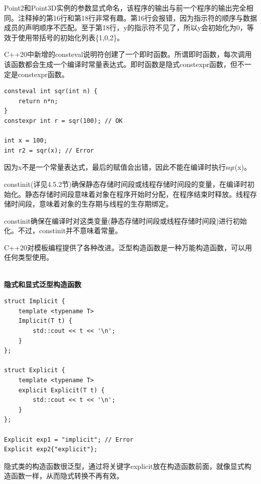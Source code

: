 Point2和Point3D实例的参数显式命名，该程序的输出与前一个程序的输出完全相同。注释掉的第16行和第18行非常有趣。第16行会报错，因为指示符的顺序与数据成员的声明顺序不匹配。至于第18行，y的指示符不见了，所以y会初始化为0，等效于使用带括号的初始化列表\{1,0,2\}。


C++20中新增的consteval说明符创建了一个即时函数。所谓即时函数，每次调用该函数都会生成一个编译时常量表达式。即时函数是隐式constexpr函数，但不一定是constexpr函数。

\begin{lstlisting}[style=styleCXX]
consteval int sqr(int n) {
	return n*n;
}
constexpr int r = sqr(100); // OK

int x = 100;
int r2 = sqr(x); // Error
\end{lstlisting}

因为x不是一个常量表达式，最后的赋值会出错，因此不能在编译时执行sqr(x)。

constinit(详见4.5.2节)确保静态存储时间段或线程存储时间段的变量，在编译时初始化。静态存储时间段意味着对象在程序开始时分配，在程序结束时释放。线程存储时间段，意味着对象的生存期与线程的生存期绑定。

constinit确保在编译时对这类变量(静态存储时间段或线程存储时间段)进行初始化。不过，constinit并不意味着常量。


C++20对模板编程提供了各种改进。泛型构造函数是一种万能构造函数，可以用任何类型使用。

\hspace*{\fill} \\ %
\noindent
\textbf{隐式和显式泛型构造函数}
\begin{lstlisting}[style=styleCXX]
struct Implicit {
	template <typename T>
	Implicit(T t) {
		std::cout << t << '\n';
	}
};

struct Explicit {
	template <typename T>
	explicit Explicit(T t) {
		std::cout << t << '\n';
	}
};

Explicit exp1 = "implicit"; // Error
Explicit exp2{"explicit"};
\end{lstlisting}

隐式类的构造函数很泛型，通过将关键字explicit放在构造函数前面，就像显式构造函数一样，从而隐式转换不再有效。


